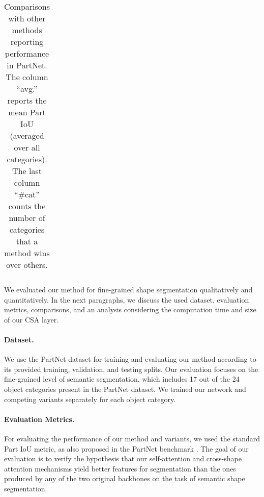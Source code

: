 \documentclass{egpubl}
\begin{document}
\begin{table*}[!ht]
\begin{center}
\begin{adjustbox}{max width=\textwidth}
\begin{tabular}{*{20}{c}}
         \bottomrule
        \end{tabular}
    \end{adjustbox}
    \end{center}
    \vspace*{-1mm}
    \caption{Comparisons with other methods reporting performance in PartNet. The column ``avg.'' reports the mean Part IoU (averaged over all  categories). The last column ``\#cat'' counts the number of categories that a method wins over others.}
    \label{table:comparisons}
\vspace{-7mm}    
\end{table*}


We evaluated our method for fine-grained shape segmentation qualitatively and quantitatively. In the next paragraphs, we discuss the used dataset, evaluation
metrics,  comparisons, and an analysis considering the computation time and size of our CSA layer.

\vspace{-1.75mm}
\paragraph*{Dataset.}
We use the PartNet dataset \cite{Mo:2019} for training and evaluating our method according to its provided training, validation, and
testing splits. Our evaluation focuses on the fine-grained level of semantic segmentation, which includes 17 out of the 24 object 
categories present in the PartNet dataset. We trained our network and competing variants separately 
for each object category.

\vspace{-1.75mm}
\paragraph*{Evaluation Metrics.} For evaluating the performance of our method and variants, we used the standard Part IoU metric, as also proposed in the PartNet benchmark
\cite{Mo:2019}.  The goal of our evaluation is to verify the hypothesis that our self-attention and cross-shape attention mechanisms yield better features for segmentation than the ones produced by any of the two original backbones on the task of semantic shape segmentation.

\vspace{-1.75mm}
\end{document}
